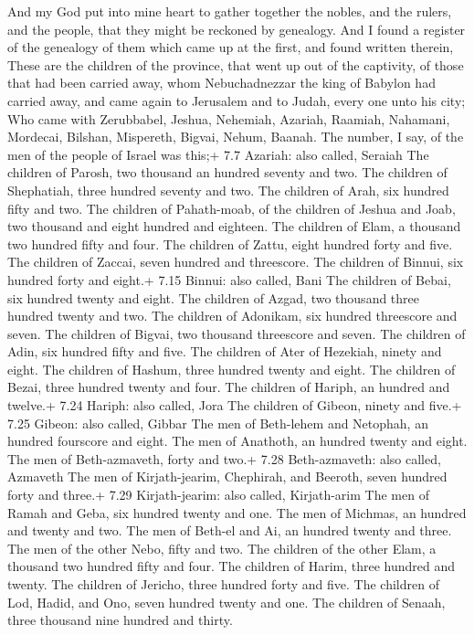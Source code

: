  And my God put into mine heart to gather together the
nobles, and the rulers, and the people, that they might be reckoned by
genealogy. And I found a register of the genealogy of them which came up
at the first, and found written therein,  These are the
children of the province, that went up out of the captivity, of those
that had been carried away, whom Nebuchadnezzar the king of Babylon had
carried away, and came again to Jerusalem and to Judah, every one unto
his city;  Who came with Zerubbabel, Jeshua, Nehemiah,
Azariah, Raamiah, Nahamani, Mordecai, Bilshan, Mispereth, Bigvai, Nehum,
Baanah. The number, I say, of the men of the people of Israel was this;+
7.7 Azariah: also called, Seraiah  The children of Parosh,
two thousand an hundred seventy and two.  The children of
Shephatiah, three hundred seventy and two.  The children of
Arah, six hundred fifty and two.  The children of
Pahath-moab, of the children of Jeshua and Joab, two thousand and eight
hundred and eighteen.  The children of Elam, a thousand two
hundred fifty and four.  The children of Zattu, eight
hundred forty and five.  The children of Zaccai, seven
hundred and threescore.  The children of Binnui, six
hundred forty and eight.+ 7.15 Binnui: also called, Bani 
The children of Bebai, six hundred twenty and eight.  The
children of Azgad, two thousand three hundred twenty and two.
 The children of Adonikam, six hundred threescore and
seven.  The children of Bigvai, two thousand threescore and
seven.  The children of Adin, six hundred fifty and five.
 The children of Ater of Hezekiah, ninety and eight.
 The children of Hashum, three hundred twenty and eight.
 The children of Bezai, three hundred twenty and four.
 The children of Hariph, an hundred and twelve.+ 7.24
Hariph: also called, Jora  The children of Gibeon, ninety
and five.+ 7.25 Gibeon: also called, Gibbar  The men of
Beth-lehem and Netophah, an hundred fourscore and eight. 
The men of Anathoth, an hundred twenty and eight.  The men
of Beth-azmaveth, forty and two.+ 7.28 Beth-azmaveth: also called,
Azmaveth  The men of Kirjath-jearim, Chephirah, and
Beeroth, seven hundred forty and three.+ 7.29 Kirjath-jearim: also
called, Kirjath-arim  The men of Ramah and Geba, six
hundred twenty and one.  The men of Michmas, an hundred and
twenty and two.  The men of Beth-el and Ai, an hundred
twenty and three.  The men of the other Nebo, fifty and
two.  The children of the other Elam, a thousand two
hundred fifty and four.  The children of Harim, three
hundred and twenty.  The children of Jericho, three hundred
forty and five.  The children of Lod, Hadid, and Ono, seven
hundred twenty and one.  The children of Senaah, three
thousand nine hundred and thirty.

